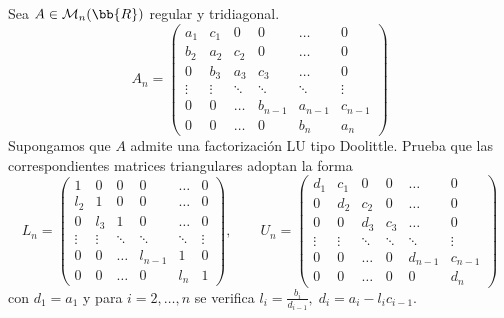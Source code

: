 \begin{ejercicio}
    Sea $A\in \mathcal{M}_n(\bb{R})$ regular y tridiagonal.
    \begin{equation*}
        A_n = \left( \begin{array}{cccccc}
            a_1 & c_1 & 0 & 0 & \dots & 0 \\
            b_2 & a_2 & c_2 & 0 & \dots & 0 \\
            0 & b_3 & a_3 & c_3 & \dots & 0 \\
            \vdots & \vdots & \ddots & \ddots & \ddots & \vdots \\
            0 & 0 & \dots & b_{n-1} & a_{n-1} & c_{n-1} \\
            0 & 0 & \dots & 0 & b_n & a_n
        \end{array} \right)
    \end{equation*}
    Supongamos que $A$ admite una factorización LU tipo Doolittle. Prueba que las correspondientes matrices triangulares adoptan la forma
    \begin{equation*}
        L_n = \left( \begin{array}{cccccc}
            1 & 0 & 0 & 0 & \dots & 0 \\
            l_2 & 1 & 0 & 0 & \dots & 0 \\
            0 & l_3 & 1 & 0 & \dots & 0 \\
            \vdots & \vdots & \ddots & \ddots & \ddots & \vdots \\
            0 & 0 & \dots & l_{n-1} & 1 & 0 \\
            0 & 0 & \dots & 0 & l_n & 1
        \end{array} \right), \qquad
        U_n = \left( \begin{array}{cccccc}
            d_1 & c_1 & 0 & 0 & \dots & 0 \\
            0 & d_2 & c_2 & 0 & \dots & 0 \\
            0 & 0 & d_3 & c_3 & \dots & 0 \\
            \vdots & \vdots & \ddots & \ddots & \ddots & \vdots \\
            0 & 0 & \dots & 0 & d_{n-1} & c_{n-1} \\
            0 & 0 & \dots & 0 & 0 & d_n
        \end{array} \right)
    \end{equation*}
    con $d_1 = a_1$ y para $i=2,\dots,n$ se verifica $l_i=\frac{b_i}{d_{i-1}},\;d_i=a_i - l_ic_{i-1}$.

\end{ejercicio}

